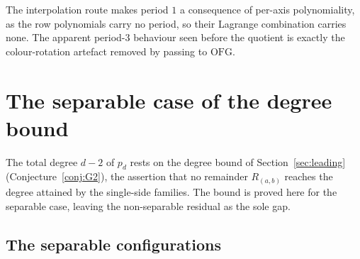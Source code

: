 \documentclass[11pt]{article}
\theoremstyle{definition}
\theoremstyle{remark}
\newcommand{\OFG}{\mathrm{OFG}}
\begin{document}
The interpolation route makes period $1$ a consequence of per-axis
polynomiality, as the row polynomials carry no period, so their Lagrange
combination carries none. The apparent period-$3$ behaviour seen before the quotient is
exactly the colour-rotation artefact removed by passing to $\OFG$.

\section{The separable case of the degree bound}\label{sec:separable}

The total degree $d-2$ of $p_d$ rests on the
degree bound of Section~\ref{sec:leading} (Conjecture~\ref{conj:G2}), the
assertion that no remainder $R_{(a,b)}$ reaches the degree attained by the
single-side families. The bound is proved here for the separable case,
leaving the non-separable residual as the sole gap.

\subsection{The separable configurations}
\end{document}
